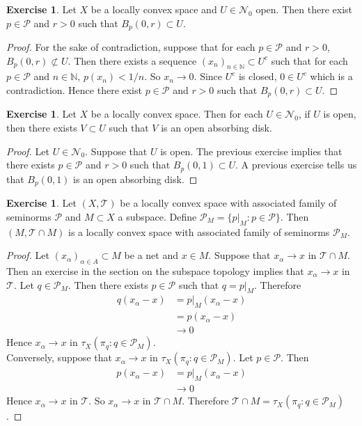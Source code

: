 \documentclass[12pt]{amsart}
\theoremstyle{definition}
\newtheorem{ex}[definition]{Exercise}
\newcommand{\al}{\alpha}
\newcommand{\N}{\mathbb{N}}
\newcommand{\MN}{\mathcal{N}}
\newcommand{\MP}{\mathcal{P}}
\newcommand{\MT}{\mathcal{T}}
\DeclareMathOperator*{\0}{\mbf{0}}
\DeclareMathOperator*{\1}{\mbf{1}}
\begin{document}
	
	\begin{ex}
		Let $X$ be a locally convex space and $U \in \MN_0$ open. Then there exist $p \in \MP$ and $r >0$ such that $B_p(0,r) \subset U$.
	\end{ex}

	\begin{proof}
		For the sake of contradiction, suppose that for each $p \in \MP$ and $r >0$, $B_p(0,r) \not \subset U$. Then there exists a sequence $(x_n)_{n \in \N} \subset U^c$ such that for each $p \in \MP$ and $n \in \N$, $p(x_n) < 1/n$. So $x_n \rightarrow 0$. Since $U^c$ is closed, $0 \in U^c$ which is a contradiction. Hence there exist $p \in \MP$ and $r >0$ such that $B_p(0,r) \subset U$.
	\end{proof}

	\begin{ex}
		Let $X$ be a locally convex space. Then for each $U \in \MN_0$, if $U$ is open, then there exists $V \subset U$ such that $V$ is an open absorbing disk.
	\end{ex}

	\begin{proof}
		Let $U \in \MN_0$. Suppose that $U$ is open. The previous exercise implies that there exists $p \in \MP$ and $r > 0$ such that $B_p(0,1) \subset U$. A previous exercise tells us that $B_p(0,1)$ is an open absorbing disk.
	\end{proof}

	\begin{ex}
		Let $(X, \MT)$ be a locally convex space with associated  family of seminorms $\MP$ and $M \subset X$ a subspace. Define $\MP_M = \{p|_M: p \in \MP\}$. Then $(M, \MT \cap M)$ is a locally convex space with associated family of seminorms $\MP_M$. 
	\end{ex}

	\begin{proof}
		Let $(x_{\al})_{\al \in A} \subset M$ be a net and $x \in M$. Suppose that $x_{\al} \rightarrow x$ in $\MT \cap M$. Then an exercise in the section on the subspace topology implies that $x_{\al} \rightarrow x$ in $\MT$. Let $q \in \MP_M$. Then there exists $p \in \MP$ such that $q = p|_M$. Therefore
		\begin{align*}
			q(x_{\al} - x) 
			&= p|_M(x_{\al} - x) \\ 
			&= p(x_{\al} - x) \\
			& \rightarrow 0
		\end{align*}  
		Hence $x_{\al} \rightarrow x$ in $\tau_X(\pi_q:q \in \MP_M)$. \\
		Conversely, suppose that $x_{\al} \rightarrow x$ in $\tau_X(\pi_q:q \in \MP_M)$. Let $p \in \MP$. Then 
		\begin{align*}
			p(x_{\al} - x) 
			&= p|_M(x_{\al} - x) \\
			& \rightarrow 0
		\end{align*}
		Hence $x_{\al} \rightarrow x$ in $\MT$. So $x_{\al} \rightarrow x$ in $\MT \cap M$. Therefore $\MT \cap M = \tau_X(\pi_q: q \in \MP_M)$. 
	\end{proof}
	
\end{document}
